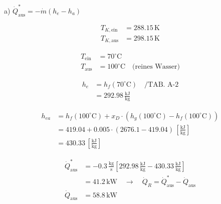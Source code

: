 a) \(\dot{Q}_{\text{aus}}^* = -\dot{m} (h_e - h_a)\)

\[
\begin{aligned}
    T_{K,\text{ein}} &= 288.15 \, \text{K} \\
    T_{K,\text{aus}} &= 298.15 \, \text{K}
\end{aligned}
\]

\[
\begin{aligned}
    T_{\text{ein}} &= 70^\circ \text{C} \\
    T_{\text{aus}} &= 100^\circ \text{C} \quad \text{(reines Wasser)}
\end{aligned}
\]

\[
\begin{aligned}
    h_e &= h_f(70^\circ \text{C}) \quad \text{/TAB. A-2} \\
    &= 292.98 \, \frac{\text{kJ}}{\text{kg}}
\end{aligned}
\]

\[
\begin{aligned}
    h_{ea} &= h_f(100^\circ \text{C}) + x_D \cdot (h_g(100^\circ \text{C}) - h_f(100^\circ \text{C})) \\
    &= 419.04 + 0.005 \cdot (2676.1 - 419.04) \, \left[\frac{\text{kJ}}{\text{kg}}\right] \\
    &= 430.33 \, \left[\frac{\text{kJ}}{\text{kg}}\right]
\end{aligned}
\]

\[
\begin{aligned}
    \dot{Q}_{\text{aus}}^* &= -0.3 \, \frac{\text{kg}}{\text{s}} \left[ 292.98 \, \frac{\text{kJ}}{\text{kg}} - 430.33 \, \frac{\text{kJ}}{\text{kg}} \right] \\
    &= 41.2 \, \text{kW} \quad \rightarrow \quad \dot{Q}_R = \dot{Q}_{\text{aus}}^* - \dot{Q}_{\text{aus}} \\
    \dot{Q}_{\text{aus}} &= 58.8 \, \text{kW}
\end{aligned}
\]